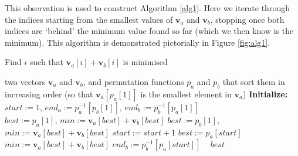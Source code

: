 \documentclass[a4paper,10pt]{article}
\begin{document}
This observation is used to construct Algorithm \ref{alg1}. Here we iterate through the indices starting from the smallest values of $\mathbf{v}_a$ and $\mathbf{v}_b$, stopping once both indices are `behind' the minimum value found so far (which we then know is the minimum). This algorithm is demonstrated pictorially in Figure \ref{fig:alg1}.

\begin{algorithm}
  \caption{Find $i$ such that $\mathbf{v}_a[i] + \mathbf{v}_b[i]$ is minimised}
  \label{alg1}
\begin{algorithmic}[1]
\REQUIRE two vectors $\mathbf{v}_a$ and $\mathbf{v}_b$, and permutation functions $p_a$ and $p_b$ that sort them in increasing order (so that $\mathbf{v}_a[p_a[1]]$ is the smallest element in $\mathbf{v}_a$)
\STATE \textbf{Initialize:} $\mathit{start} := 1$,
$\mathit{end}_a := p_a^{-1}[p_b[1]]$, $\mathit{end}_b := p_b^{-1}[p_a[1]]$
\\
\STATE $\mathit{best} := p_a[1]$, $\mathit{min} := \mathbf{v}_a[\mathit{best}]+\mathbf{v}_b[\mathit{best}]$
\STATE $\mathit{best} := p_b[1]$, $\mathit{min} := \mathbf{v}_a[\mathit{best}]+\mathbf{v}_b[\mathit{best}]$
\ENDIF
{}\label{line2}
\STATE $\mathit{start} := \mathit{start} + 1$
 \label{if1}
\STATE $\mathit{best} := p_a[\mathit{start}]$
\STATE $\mathit{min} := \mathbf{v}_a[\mathit{best}] + \mathbf{v}_b[\mathit{best}]$
\ENDIF
{}
\STATE $\mathit{end}_b := p_b^{-1}[p_a[\mathit{start}]]$
\ENDIF \label{endif1}
\STATE {} \label{line:repeat}
\ENDWHILE\ 
\RETURN $\mathit{best}$
\end{algorithmic}
\end{algorithm}
\end{document}
